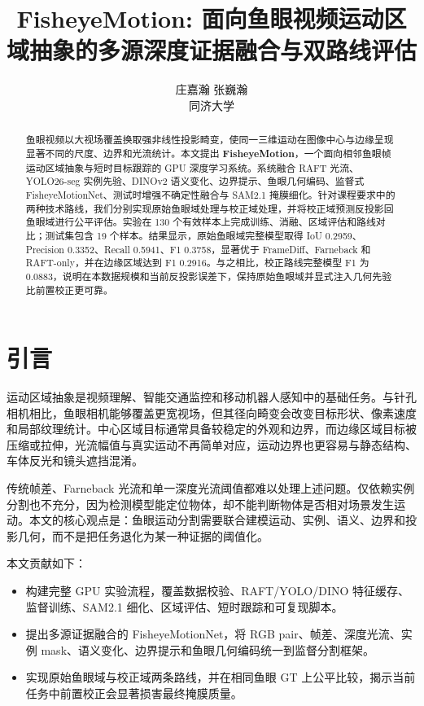 \documentclass[10pt,twocolumn]{article}
\title{\vspace{-1.0em}\bfseries FisheyeMotion: {\cjkfont 面向鱼眼视频运动区域抽象的多源深度证据融合与双路线评估}}
\author{{\cjkfont 2354265 庄嘉瀚 \quad 2351745 张巍瀚}\\{\cjkfont 同济大学}}
\date{}
\begin{document}
\maketitle
\vspace{-1.1em}

\begin{abstract}
{\cjkfont 鱼眼视频以大视场覆盖换取强非线性投影畸变，使同一三维运动在图像中心与边缘呈现显著不同的尺度、边界和光流统计。本文提出} \textbf{FisheyeMotion}{\cjkfont ，一个面向相邻鱼眼帧运动区域抽象与短时目标跟踪的} GPU {\cjkfont 深度学习系统。系统融合} RAFT {\cjkfont 光流、}YOLO26-seg {\cjkfont 实例先验、}DINOv2 {\cjkfont 语义变化、边界提示、鱼眼几何编码、监督式} FisheyeMotionNet{\cjkfont 、测试时增强不确定性融合与} SAM2.1 {\cjkfont 掩膜细化。针对课程要求中的两种技术路线，我们分别实现原始鱼眼域处理与校正域处理，并将校正域预测反投影回鱼眼域进行公平评估。实验在} 130 {\cjkfont 个有效样本上完成训练、消融、区域评估和路线对比；测试集包含} 19 {\cjkfont 个样本。结果显示，原始鱼眼域完整模型取得} IoU 0.2959{\cjkfont 、}Precision 0.3352{\cjkfont 、}Recall 0.5941{\cjkfont 、}F1 0.3758{\cjkfont ，显著优于} FrameDiff{\cjkfont 、}Farneback {\cjkfont 和} RAFT-only{\cjkfont ，并在边缘区域达到} F1 0.2916{\cjkfont 。与之相比，校正路线完整模型} F1 {\cjkfont 为} 0.0883{\cjkfont ，说明在本数据规模和当前反投影误差下，保持原始鱼眼域并显式注入几何先验比前置校正更可靠。}
\end{abstract}

\section{{\cjkfont 引言}}
{\cjkfont 运动区域抽象是视频理解、智能交通监控和移动机器人感知中的基础任务。与针孔相机相比，鱼眼相机能够覆盖更宽视场，但其径向畸变会改变目标形状、像素速度和局部纹理统计。中心区域目标通常具备较稳定的外观和边界，而边缘区域目标被压缩或拉伸，光流幅值与真实运动不再简单对应，运动边界也更容易与静态结构、车体反光和镜头遮挡混淆。}

{\cjkfont 传统帧差、}Farneback {\cjkfont 光流和单一深度光流阈值都难以处理上述问题。仅依赖实例分割也不充分，因为检测模型能定位物体，却不能判断物体是否相对场景发生运动。本文的核心观点是：鱼眼运动分割需要联合建模运动、实例、语义、边界和投影几何，而不是把任务退化为某一种证据的阈值化。}

{\cjkfont 本文贡献如下：}
\begin{itemize}
  \item {\cjkfont 构建完整} GPU {\cjkfont 实验流程，覆盖数据校验、}RAFT/YOLO/DINO {\cjkfont 特征缓存、监督训练、}SAM2.1 {\cjkfont 细化、区域评估、短时跟踪和可复现脚本。}
  \item {\cjkfont 提出多源证据融合的} FisheyeMotionNet{\cjkfont ，将} RGB pair{\cjkfont 、帧差、深度光流、实例} mask{\cjkfont 、语义变化、边界提示和鱼眼几何编码统一到监督分割框架。}
  \item {\cjkfont 实现原始鱼眼域与校正域两条路线，并在相同鱼眼} GT {\cjkfont 上公平比较，揭示当前任务中前置校正会显著损害最终掩膜质量。}
\end{itemize}
\end{document}
